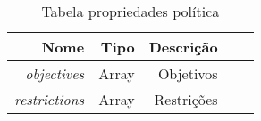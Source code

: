 \begin{table}[!htb]
    \centering
    \caption[resource-optimization-shape]{Tabela propriedades política
    \label{tab:tabela-optimization}}
    \begin{tabular}{rrrrr}
        \toprule
            Nome & Tipo & Descrição \\ 
        \midrule
            \textit{objectives} & Array & Objetivos \\
            \textit{restrictions} & Array &  Restrições \\
        \bottomrule
    \end{tabular}
\end{table}
